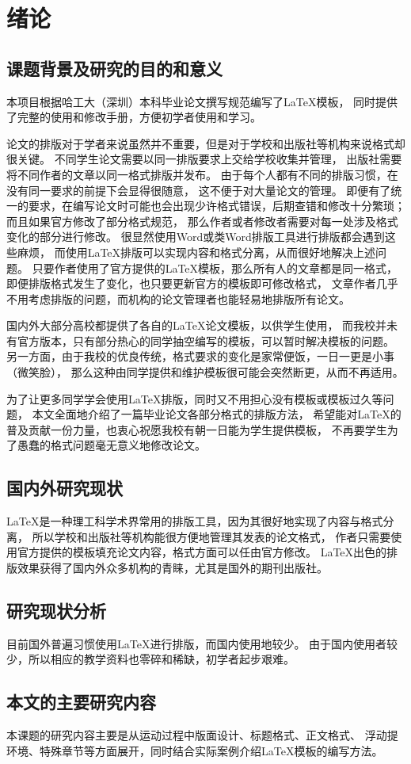 \chapter{绪论}

\section{课题背景及研究的目的和意义}
本项目根据哈工大（深圳）本科毕业论文撰写规范编写了\LaTeX 模板，
同时提供了完整的使用和修改手册，方便初学者使用和学习。

论文的排版对于学者来说虽然并不重要，但是对于学校和出版社等机构来说格式却很关键。
不同学生论文需要以同一排版要求上交给学校收集并管理，
出版社需要将不同作者的文章以同一格式排版并发布。
由于每个人都有不同的排版习惯，在没有同一要求的前提下会显得很随意，
这不便于对大量论文的管理。
即便有了统一的要求，在编写论文时可能也会出现少许格式错误，后期查错和修改十分繁琐；
而且如果官方修改了部分格式规范，
那么作者或者修改者需要对每一处涉及格式变化的部分进行修改。
很显然使用Word或类Word排版工具进行排版都会遇到这些麻烦，
而使用\LaTeX 排版可以实现内容和格式分离，从而很好地解决上述问题。
只要作者使用了官方提供的\LaTeX 模板，那么所有人的文章都是同一格式，
即便排版格式发生了变化，也只要更新官方的模板即可修改格式，
文章作者几乎不用考虑排版的问题，而机构的论文管理者也能轻易地排版所有论文。

国内外大部分高校都提供了各自的\LaTeX 论文模板，以供学生使用，
而我校并未有官方版本，只有部分热心的同学抽空编写的模板，可以暂时解决模板的问题。
另一方面，由于我校的优良传统，格式要求的变化是家常便饭，一日一更是小事（微笑脸），
那么这种由同学提供和维护模板很可能会突然断更，从而不再适用。

为了让更多同学学会使用\LaTeX 排版，同时又不用担心没有模板或模板过久等问题，
本文全面地介绍了一篇毕业论文各部分格式的排版方法，
希望能对\LaTeX 的普及贡献一份力量，也衷心祝愿我校有朝一日能为学生提供模板，
不再要学生为了愚蠢的格式问题毫无意义地修改论文。

\section{国内外研究现状}
\LaTeX 是一种理工科学术界常用的排版工具，因为其很好地实现了内容与格式分离，
所以学校和出版社等机构能很方便地管理其发表的论文格式，
作者只需要使用官方提供的模板填充论文内容，格式方面可以任由官方修改。
\LaTeX 出色的排版效果获得了国内外众多机构的青睐，尤其是国外的期刊出版社。

\section{研究现状分析}
目前国外普遍习惯使用\LaTeX 进行排版，而国内使用地较少。
由于国内使用者较少，所以相应的教学资料也零碎和稀缺，初学者起步艰难。

\section{本文的主要研究内容}
本课题的研究内容主要是从运动过程中版面设计、标题格式、正文格式、
浮动提环境、特殊章节等方面展开，同时结合实际案例介绍\LaTeX 模板的编写方法。

